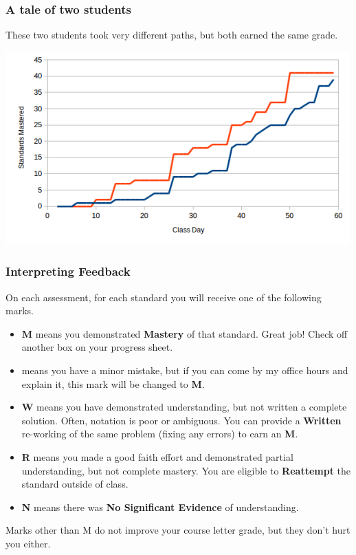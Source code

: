\documentclass[aspectration=1610]{beamer}
\begin{document}
\begin{frame}\frametitle{A tale of two students}
These two students took very different paths, but both earned the same grade.
\begin{center}
\includegraphics[scale=0.7]{student-comparison.png}
\end{center}
\end{frame}



\begin{frame}\frametitle{Interpreting Feedback}
On each assessment, for each standard you will receive one of the following marks.
\begin{itemize}
\item {\bf M} means you demonstrated \textbf{Mastery} of that standard.
      Great job!  Check off another box on your progress sheet.
\item {\bf *} means you have a minor mistake, but if you can come by my office hours and explain it,
      this mark will be changed to {\bf M}.
\item {\bf W} means you have demonstrated understanding, but not written a complete solution.  Often, notation is poor or ambiguous.  You can provide a {\bf Written} re-working of the same problem (fixing any errors) to earn an {\bf M}.
\item {\bf R} means you made a good faith effort and demonstrated
      partial understanding, but not complete mastery. You are eligible to
      \textbf{Reattempt} the standard outside of class.
\item {\bf N} means there was \textbf{No Significant Evidence} of understanding.
\end{itemize}

\vspace{0.2in}

Marks other than M do not improve your course letter grade, but
they don't hurt you either.
\end{frame}
\end{document}
